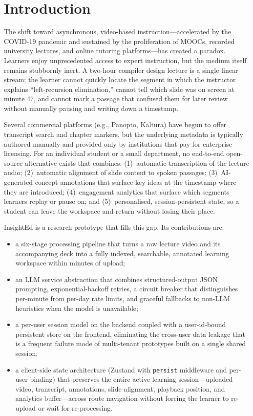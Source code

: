 \documentclass[conference]{IEEEtran}
\begin{document}
\section{Introduction}

The shift toward asynchronous, video-based instruction---accelerated by the COVID-19 pandemic and sustained by the proliferation of MOOCs, recorded university lectures, and online tutoring platforms---has created a paradox. Learners enjoy unprecedented access to expert instruction, but the medium itself remains stubbornly inert. A two-hour compiler design lecture is a single linear stream; the learner cannot quickly locate the segment in which the instructor explains ``left-recursion elimination,'' cannot tell which slide was on screen at minute 47, and cannot mark a passage that confused them for later review without manually pausing and writing down a timestamp.

Several commercial platforms (e.g., Panopto, Kaltura) have begun to offer transcript search and chapter markers, but the underlying metadata is typically authored manually and provided only by institutions that pay for enterprise licensing. For an individual student or a small department, no end-to-end open-source alternative exists that combines: (1)~automatic transcription of the lecture audio; (2)~automatic alignment of slide content to spoken passages; (3)~AI-generated concept annotations that surface key ideas at the timestamp where they are introduced; (4)~engagement analytics that surface which segments learners replay or pause on; and (5)~personalised, session-persistent state, so a student can leave the workspace and return without losing their place.

InsightEd is a research prototype that fills this gap. Its contributions are:

\begin{itemize}
    \item a six-stage processing pipeline that turns a raw lecture video and its accompanying deck into a fully indexed, searchable, annotated learning workspace within minutes of upload;
    \item an LLM service abstraction that combines structured-output JSON prompting, exponential-backoff retries, a circuit breaker that distinguishes per-minute from per-day rate limits, and graceful fallbacks to non-LLM heuristics when the model is unavailable;
    \item a per-user session model on the backend coupled with a user-id-bound persistent store on the frontend, eliminating the cross-user data leakage that is a frequent failure mode of multi-tenant prototypes built on a single shared session;
    \item a client-side state architecture (Zustand with \texttt{persist} middleware and per-user binding) that preserves the entire active learning session---uploaded video, transcript, annotations, slide alignment, playback position, and analytics buffer---across route navigation without forcing the learner to re-upload or wait for re-processing.
\end{itemize}
\end{document}
